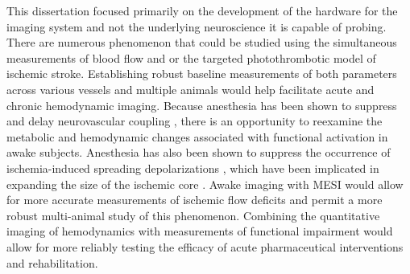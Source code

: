 This dissertation focused primarily on the development of the hardware for the imaging system and not the underlying neuroscience it is capable of probing. There are numerous phenomenon that could be studied using the simultaneous measurements of blood flow and  or the targeted photothrombotic model of ischemic stroke. Establishing robust baseline measurements of both parameters across various vessels and multiple animals would help facilitate acute and chronic hemodynamic imaging. Because anesthesia has been shown to suppress and delay neurovascular coupling \cite{Pisauro:2013cx}, there is an opportunity to reexamine the metabolic and hemodynamic changes associated with functional activation \cite{Dunn:2005gw} in awake subjects. Anesthesia has also been shown to suppress the occurrence of ischemia-induced spreading depolarizations \cite{Kudo:2016ho}, which have been implicated in expanding the size of the ischemic core \cite{Shin:2006dc}. Awake imaging with MESI would allow for more accurate measurements of ischemic flow deficits and permit a more robust multi-animal study of this phenomenon. Combining the quantitative imaging of hemodynamics with measurements of functional impairment would allow for more reliably testing the efficacy of acute pharmaceutical interventions and rehabilitation.



